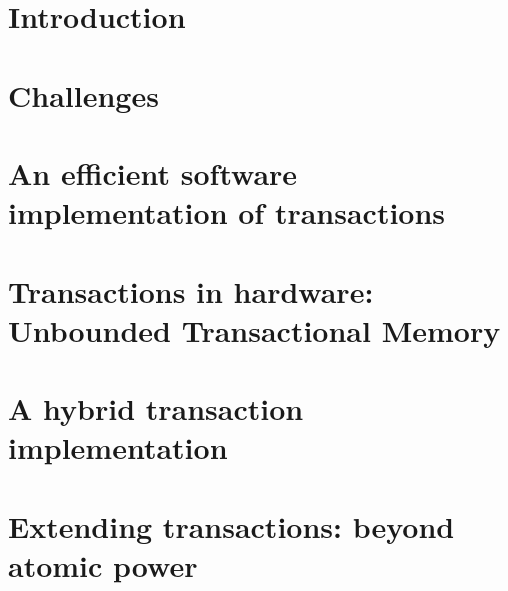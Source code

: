 \documentclass{phd-thesis}
\author{C. Scott Ananian}
\title{\subtitle}
\date{\subdate \\ $ $Revision: 1.21 $ $}
\begin{document}

\frontmatter


\mainmatter
\chapter{Introduction}


\chapter{Challenges}


\chapter[Efficient software impl. of trans.]{An efficient software implementation of transactions}\label{sec:softimpl}


\chapter[Transactions in hardware]{Transactions in hardware: Unbounded Transactional Memory}\label{sec:hardimpl}



\chapter{A hybrid transaction implementation}\label{sec:hybrid}


\chapter[Extending transactions]{Extending transactions: beyond atomic power}

\end{document}
